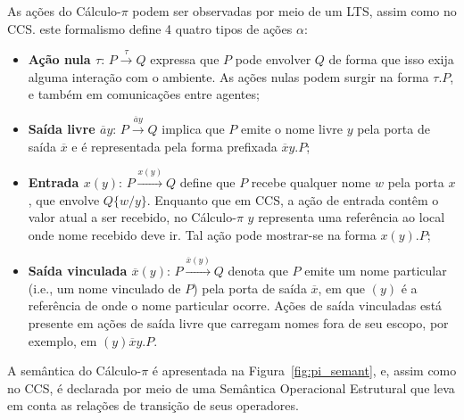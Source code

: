 As ações do Cálculo-$\pi$ podem ser observadas por meio de um LTS, assim como no CCS. este formalismo define 4 quatro tipos de ações $\alpha$:
\begin{itemize}
	\item \textbf{Ação nula $\tau$}: $P \stackrel{\tau}{\longrightarrow} Q$ expressa que $P$ pode envolver $Q$ de forma que isso exija alguma interação com o ambiente. As ações nulas podem surgir na forma $\tau.P$, e também em comunicações entre agentes;
	\item \textbf{Saída livre $\overline{a}y$}: $P \stackrel{\overline{a}y}{\longrightarrow} Q$ implica que $P$ emite o nome livre $y$ pela porta de saída $\overline{x}$ e é representada pela forma prefixada $\overline{x}y.P$;
	\item \textbf{Entrada $x(y)$}: $P \stackrel{x(y)}{\longrightarrow} Q$ define que $P$ recebe qualquer nome $w$ pela porta $x$, que envolve $Q\{w/y\}$. Enquanto que em CCS, a ação de entrada contêm o valor atual a ser recebido, no Cálculo-$\pi$ $y$ representa uma referência ao local onde nome recebido deve ir. Tal ação pode mostrar-se na forma $x(y).P$;
	\item \textbf{Saída vinculada $\overline{x}(y)$}: $P \stackrel{\overline{x}(y)}{\longrightarrow} Q$ denota que $P$ emite um nome particular (i.e., um nome vinculado de $P$) pela porta de saída $\overline{x}$, em que $(y)$ é a referência de onde o nome particular ocorre. Ações de saída vinculadas está presente em ações de saída livre que carregam nomes fora de seu escopo, por exemplo, em $(y)\overline{x}y.P$.
\end{itemize}

A semântica do Cálculo-$\pi$ é apresentada na Figura~\ref{fig:pi_semant}, e, assim como no CCS, é declarada por meio de uma Semântica Operacional Estrutural que leva em conta as relações de transição de seus operadores.

